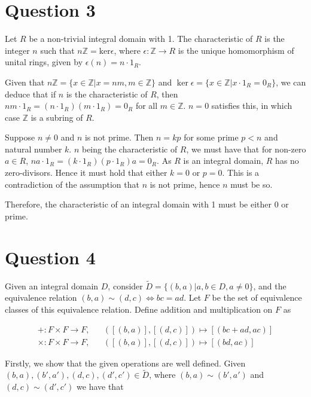 \documentclass{article}
\begin{document}
\section*{Question 3}

Let $R$ be a non-trivial integral domain with 1. The characteristic of $R$
is the integer $n$ such that $n\mathbb{Z} = \text{ker}\epsilon$, where
$\epsilon: \mathbb{Z} \to R$ is the unique homomorphism of unital rings, given
by $\epsilon(n) = n\cdot1_R$.

\hfill\break
Given that $n\mathbb{Z} = \{x \in \mathbb{Z} | x = nm, m \in \mathbb{Z}\}$ and
$\ker\epsilon = \{x \in \mathbb{Z} | x\cdot1_R = 0_R\}$, we can deduce that
if $n$ is the characteristic of $R$, then $nm\cdot1_R = (n\cdot1_R)(m\cdot1_R) = 0_R$
for all $m \in \mathbb{Z}$. $n = 0$ satisfies this, in which case $\mathbb{Z}$ is a
subring of $R$.

\hfill\break
Suppose $n \neq 0$ and $n$ is not prime. Then $n = kp$ for some prime $p < n$ and
natural number $k$. $n$ being the characteristic of $R$, we must have that for
non-zero $a \in R$, $na\cdot1_R = (k\cdot1_R)(p\cdot1_R)a = 0_R$. As $R$ is an
integral domain, $R$ has no zero-divisors. Hence it must hold that either $k = 0$
or $p = 0$. This is a contradiction of the assumption that $n$ is not prime, hence
$n$ must be so.

\hfill\break
Therefore, the characteristic of an integral domain with 1 must be either 0 or prime.

\section*{Question 4}

Given an integral domain $D$, consider
$\widetilde{D} = \{(b, a) | a, b \in D, a \neq 0\}$, and the equivalence
relation $(b, a) \sim (d, c) \iff bc = ad$. Let $F$ be the set of equivalence
classes of this equivalence relation. Define addition and multiplication on
$F$ as

\begin{align*}
    + : F \times F \to F, && ([(b, a)], [(d, c)]) \mapsto [(bc + ad, ac)]\\
    \times: F \times F \to F, && ([(b, a)], [(d, c)]) \mapsto [(bd, ac)]
\end{align*}

Firstly, we show that the given operations are well defined. Given
$(b, a), (b', a'), (d, c), (d', c') \in \widetilde{D}$,
where $(b, a) \sim (b', a')$ and $(d, c) \sim (d', c')$
we have that
\end{document}
